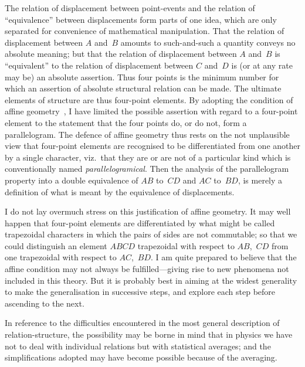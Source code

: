 \documentclass[12pt]{book}
\begin{document}
The relation of displacement between point-events and the relation of
%
``equivalence'' between displacements form parts of one idea, which are only
separated for convenience of mathematical manipulation. That the relation of
displacement between $A$ and~$B$ amounts to such-and-such a quantity conveys
no absolute meaning; but that the relation of displacement between $A$ and~$B$
is ``equivalent'' to the relation of displacement between $C$ and~$D$ is (or at
any rate may be) an absolute assertion. Thus four points is the minimum
number for which an assertion of absolute structural relation can be made.
The ultimate elements of structure are thus four-point elements. By adopting
the condition of affine geometry~, I have limited the possible assertion
with regard to a four-point element to the statement that the four points do,
or do not, form a parallelogram. The defence of affine geometry thus rests on
the not unplausible view that four-point elements are recognised to be differentiated
from one another by a single character, viz.\ that they are or are not
of a particular kind which is conventionally named \emph{parallelogramical}. Then
%
the analysis of the parallelogram property into a double equivalence of $AB$ to~$CD$
and $AC$ to~$BD$, is merely a definition of what is meant by the equivalence
of displacements.

I do not lay overmuch stress on this justification of affine geometry. It
may well happen that four-point elements are differentiated by what might
be called trapezoidal characters in which the pairs of sides are not commutable;
so that we could distinguish an element $ABCD$ trapezoidal with respect to
$AB$,~$CD$ from one trapezoidal with respect to $AC$,~$BD$. I am quite prepared
to believe that the affine condition may not always be fulfilled---giving rise to
new phenomena not included in this theory. But it is probably best in aiming
at the widest generality to make the generalisation in successive steps, and
explore each step before ascending to the next.

In reference to the difficulties encountered in the most general description
of relation-structure, the possibility may be borne in mind that in physics we
have not to deal with individual relations but with statistical averages; and
the simplifications adopted may have become possible because of the averaging.

%
\end{document}
